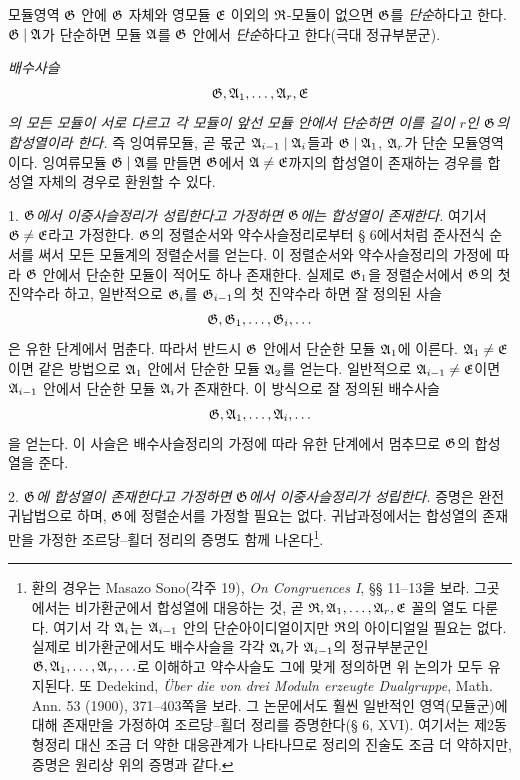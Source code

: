 모듈영역 \(\mathfrak G\) 안에 \(\mathfrak G\) 자체와 영모듈 \(\mathfrak E\) 이외의 \(\mathfrak{R}\)-모듈이 없으면 \(\mathfrak G\)를 \emph{단순}하다고 한다. \(\mathfrak G\mid\mathfrak A\)가 단순하면 모듈 \(\mathfrak A\)를 \(\mathfrak G\) 안에서 \emph{단순}하다고 한다(극대 정규부분군).

\emph{배수사슬}
\[
        \mathfrak G,\mathfrak A_1,\ldots,\mathfrak A_r,\mathfrak E
\]
\emph{의 모든 모듈이 서로 다르고 각 모듈이 앞선 모듈 안에서 단순하면 이를 길이 \(r\)인 \(\mathfrak G\)의 합성열이라 한다.} 즉 잉여류모듈, 곧 몫군 \(\mathfrak A_{i-1}\mid\mathfrak A_i\)들과 \(\mathfrak G\mid\mathfrak A_1\), \(\mathfrak A_r\)가 단순 모듈영역이다. 잉여류모듈 \(\mathfrak G\mid\mathfrak A\)를 만들면 \(\mathfrak G\)에서 \(\mathfrak A\ne\mathfrak E\)까지의 합성열이 존재하는 경우를 합성열 자체의 경우로 환원할 수 있다.

1. \emph{\(\mathfrak G\)에서 이중사슬정리가 성립한다고 가정하면 \(\mathfrak G\)에는 합성열이 존재한다.} 여기서 \(\mathfrak G\ne\mathfrak E\)라고 가정한다. \(\mathfrak G\)의 정렬순서와 약수사슬정리로부터 § 6에서처럼 준사전식 순서를 써서 모든 모듈계의 정렬순서를 얻는다. 이 정렬순서와 약수사슬정리의 가정에 따라 \(\mathfrak G\) 안에서 단순한 모듈이 적어도 하나 존재한다. 실제로 \(\mathfrak G_1\)을 정렬순서에서 \(\mathfrak G\)의 첫 진약수라 하고, 일반적으로 \(\mathfrak G_i\)를 \(\mathfrak G_{i-1}\)의 첫 진약수라 하면 잘 정의된 사슬
\[
        \mathfrak G,\mathfrak G_1,\ldots,\mathfrak G_i,\ldots
\]
은 유한 단계에서 멈춘다. 따라서 반드시 \(\mathfrak G\) 안에서 단순한 모듈 \(\mathfrak A_1\)에 이른다. \(\mathfrak A_1\ne\mathfrak E\)이면 같은 방법으로 \(\mathfrak A_1\) 안에서 단순한 모듈 \(\mathfrak A_2\)를 얻는다. 일반적으로 \(\mathfrak A_{i-1}\ne\mathfrak E\)이면 \(\mathfrak A_{i-1}\) 안에서 단순한 모듈 \(\mathfrak A_i\)가 존재한다. 이 방식으로 잘 정의된 배수사슬
\[
        \mathfrak G,\mathfrak A_1,\ldots,\mathfrak A_i,\ldots
\]
을 얻는다. 이 사슬은 배수사슬정리의 가정에 따라 유한 단계에서 멈추므로 \(\mathfrak G\)의 합성열을 준다.

2. \emph{\(\mathfrak G\)에 합성열이 존재한다고 가정하면 \(\mathfrak G\)에서 이중사슬정리가 성립한다.} 증명은 완전귀납법으로 하며, \(\mathfrak G\)에 정렬순서를 가정할 필요는 없다. 귀납과정에서는 합성열의 존재만을 가정한 조르당--횔더 정리의 증명도 함께 나온다\footnote{환의 경우는 Masazo Sono(각주 19), \emph{On Congruences I}, §§ 11--13을 보라. 그곳에서는 비가환군에서 합성열에 대응하는 것, 곧 \(\mathfrak{R},\mathfrak A_1,\ldots,\mathfrak A_r,\mathfrak E\) 꼴의 열도 다룬다. 여기서 각 \(\mathfrak A_i\)는 \(\mathfrak A_{i-1}\) 안의 단순아이디얼이지만 \(\mathfrak{R}\)의 아이디얼일 필요는 없다. 실제로 비가환군에서도 배수사슬을 각각 \(\mathfrak A_i\)가 \(\mathfrak A_{i-1}\)의 정규부분군인 \(\mathfrak G,\mathfrak A_1,\ldots,\mathfrak A_r,\ldots\)로 이해하고 약수사슬도 그에 맞게 정의하면 위 논의가 모두 유지된다. 또 Dedekind, \emph{Über die von drei Moduln erzeugte Dualgruppe}, Math. Ann. 53 (1900), 371--403쪽을 보라. 그 논문에서도 훨씬 일반적인 영역(모듈군)에 대해 존재만을 가정하여 조르당--횔더 정리를 증명한다(§ 6, XVI). 여기서는 제2동형정리 대신 조금 더 약한 대응관계가 나타나므로 정리의 진술도 조금 더 약하지만, 증명은 원리상 위의 증명과 같다.}.

